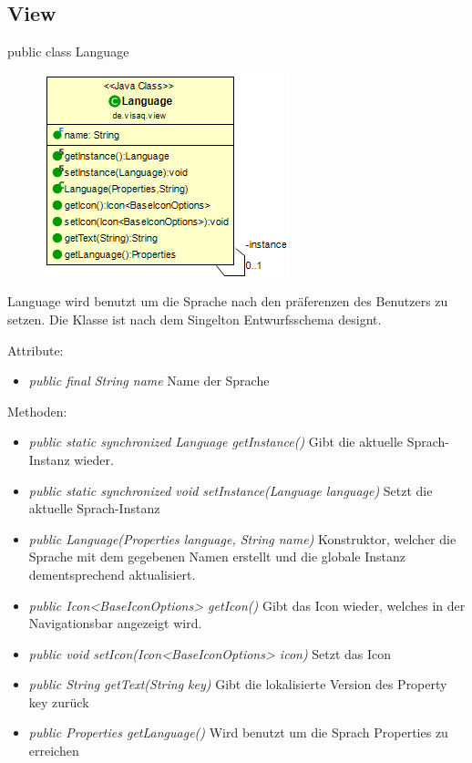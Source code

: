 \subsection{View}

public class Language

\begin{minipage}{0.3\textwidth}
    \begin{figure}[H]
        \includegraphics[scale = 0.5]{media/frontend/view/de.view/Language_Class.png}
    \end{figure}
\end{minipage} \hfill
\begin{minipage}{0.6\textwidth}
    Language wird benutzt um die Sprache nach den präferenzen des Benutzers zu setzen. Die Klasse ist nach dem Singelton Entwurfsschema designt.
\end{minipage}

Attribute:
\begin{itemize}
    \item \emph{public final String name} Name der Sprache
\end{itemize}
Methoden:
\begin{itemize}
    \item \emph{public static synchronized Language getInstance()} Gibt die aktuelle Sprach-Instanz wieder.
    \item \emph{public static synchronized void setInstance(Language language)} Setzt die aktuelle Sprach-Instanz
    \item \emph{public Language(Properties language, String name)} Konstruktor, welcher die Sprache mit dem gegebenen Namen erstellt und die globale Instanz dementsprechend aktualisiert.
    \item \emph{public Icon<BaseIconOptions> getIcon()} Gibt das Icon wieder, welches in der Navigationsbar angezeigt wird.
    \item \emph{public void setIcon(Icon<BaseIconOptions> icon)} Setzt das Icon
    \item \emph{public String getText(String key)} Gibt die lokalisierte Version des Property key zurück
    \item \emph{public Properties getLanguage()} Wird benutzt um die Sprach Properties zu erreichen
\end{itemize}

